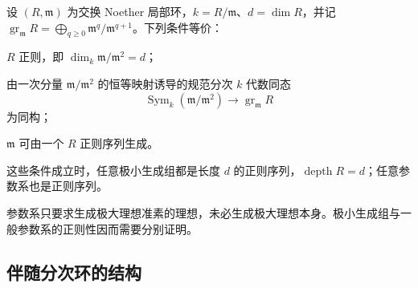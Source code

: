 \begin{theorem}\label{b3:thm:regular-local-characterizations}
	设 \((R,\mathfrak m)\) 为交换 Noether 局部环，\(k=R/\mathfrak m\)、\(d=\dim R\)，并记 \(\operatorname{gr}_{\mathfrak m}R=\bigoplus_{q\ge0}\mathfrak m^q/\mathfrak m^{q+1}\)。下列条件等价：
	\begin{equivalences}
		\item \(R\) 正则，即 \(\dim_k\mathfrak m/\mathfrak m^2=d\)；
		\item 由一次分量 \(\mathfrak m/\mathfrak m^2\) 的恒等映射诱导的规范分次 \(k\) 代数同态
			\[
				\operatorname{Sym}_k(\mathfrak m/\mathfrak m^2) \longrightarrow\operatorname{gr}_{\mathfrak m}R
			\]
			为同构；
		\item \(\mathfrak m\) 可由一个 \(R\) 正则序列生成。
	\end{equivalences}
	这些条件成立时，任意极小生成组都是长度 \(d\) 的正则序列，\(\operatorname{depth}R=d\)；任意参数系也是正则序列。
\end{theorem}

参数系只要求生成极大理想准素的理想，未必生成极大理想本身。极小生成组与一般参数系的正则性因而需要分别证明。

\subsection{伴随分次环的结构}
\label{b3:subsec:1801:02}

